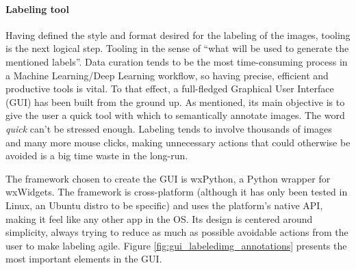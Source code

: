 \documentclass[../main.tex]{subfiles}
\begin{document}
\paragraph{Labeling tool}
Having defined the style and format desired for the labeling of the images, tooling is the next logical step. Tooling in the sense of ``what will be used to generate the mentioned labels''. Data curation tends to be the most time-consuming process in a Machine Learning/Deep Learning workflow, so having precise, efficient and productive tools is vital. To that effect, a full-fledged Graphical User Interface (GUI) has been built from the ground up. As mentioned, its main objective is to give the user a quick tool with which to semantically annotate images. The word \emph{quick} can't be stressed enough. Labeling tends to involve thousands of images and many more mouse clicks, making unnecessary actions that could otherwise be avoided is a big time waste in the long-run.

The framework chosen to create the GUI is wxPython, a Python wrapper for wxWidgets. The framework is cross-platform (although it has only been tested in Linux, an Ubuntu distro to be specific) and uses the platform's native API, making it feel like any other app in the OS. Its design is centered around simplicity, always trying to reduce as much as possible avoidable actions from the user to make labeling agile. Figure \ref{fig:gui_labeledimg_annotations} presents the most important elements in the GUI.
\end{document}

